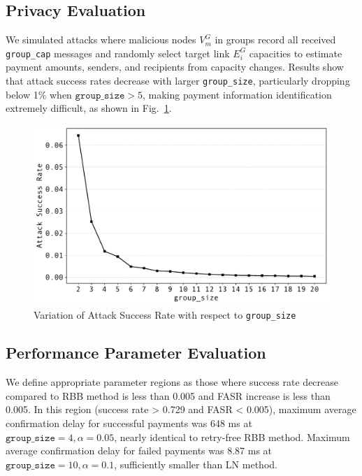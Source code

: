 \documentclass[conference]{IEEEtran}
\newcommand{\groupcap}{\texttt{group\_cap}}
\newcommand{\groupsize}{\texttt{group\_size}}
\begin{document}
\subsection{Privacy Evaluation}

We simulated attacks where malicious nodes $V_{m}^{G}$ in groups record all received \groupcap{} messages and randomly select target link $E_{i}^{G}$ capacities to estimate payment amounts, senders, and recipients from capacity changes. Results show that attack success rates decrease with larger \groupsize{}, particularly dropping below 1\% when $\groupsize > 5$, making payment information identification extremely difficult, as shown in Fig.~\ref{fig:group_size_vs_attack_resistance}.

\begin{figure}[htbp]
	\centerline{\includegraphics[width=\linewidth]{fig/group_size_vs_attack_resistance}}
	\caption{Variation of Attack Success Rate with respect to \groupsize{}}
	\label{fig:group_size_vs_attack_resistance}
\end{figure}

\subsection{Performance Parameter Evaluation}

We define appropriate parameter regions as those where success rate decrease compared to RBB method is less than 0.005 and FASR increase is less than 0.005. In this region (success rate > 0.729 and FASR < 0.005), maximum average confirmation delay for successful payments was 648 ms at $\groupsize=4, \alpha=0.05$, nearly identical to retry-free RBB method. Maximum average confirmation delay for failed payments was 8.87 ms at $\groupsize=10, \alpha=0.1$, sufficiently smaller than LN method.
\end{document}
